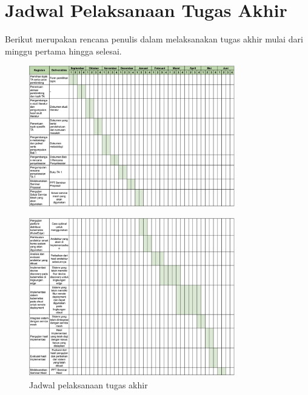 \section{Jadwal Pelaksanaan Tugas Akhir}

Berikut merupakan rencana penulis dalam melaksanakan tugas akhir mulai dari minggu pertama hingga selesai.


\begin{figure}[h]
  \centering
  \includegraphics[width=0.8\textwidth]{resources/chapter-1/jadwal-ta-1.jpg}
  \label{fig:jadwal-ta-1}
\end{figure}

\begin{figure}[h]
  \centering
  \includegraphics[width=0.8\textwidth]{resources/chapter-1/jadwal-ta-2.jpg}
  \caption{Jadwal pelaksanaan tugas akhir}
  \label{fig:jadwal-ta-2}
\end{figure}